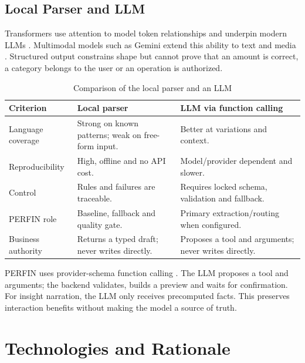 \subsection{Local Parser and LLM}

Transformers use attention to model token relationships and underpin modern LLMs \cite{vaswani2017}. Multimodal models such as Gemini extend this ability to text and media \cite{gemini2023}. Structured output constrains shape but cannot prove that an amount is correct, a category belongs to the user or an operation is authorized.

\begin{table}[H]
  \centering
  \caption{Comparison of the local parser and an LLM}
  \label{tab:parser-llm-comparison}
  \begin{tabularx}{\textwidth}{@{}L{3.0cm}Y Y@{}}
    \toprule
    \textbf{Criterion} & \textbf{Local parser} & \textbf{LLM via function calling} \\
    \midrule
    Language coverage & Strong on known patterns; weak on free-form input. & Better at variations and context. \\
    Reproducibility & High, offline and no API cost. & Model/provider dependent and slower. \\
    Control & Rules and failures are traceable. & Requires locked schema, validation and fallback. \\
    PERFIN role & Baseline, fallback and quality gate. & Primary extraction/routing when configured. \\
    Business authority & Returns a typed draft; never writes directly. & Proposes a tool and arguments; never writes directly. \\
    \bottomrule
  \end{tabularx}
\end{table}

PERFIN uses provider-schema function calling \cite{geminifunctioncalling}. The LLM proposes a tool and arguments; the backend validates, builds a preview and waits for confirmation. For insight narration, the LLM only receives precomputed facts. This preserves interaction benefits without making the model a source of truth.

\section{Technologies and Rationale}
\label{sec:tech-rationale}

